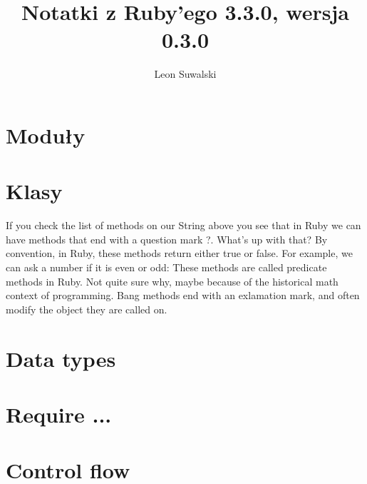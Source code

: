 \documentclass{a5charun}
\title{Notatki z Ruby'ego 3.3.0, wersja 0.3.0}
\author{Leon Suwalski}
\begin{document}
\maketitle

\section{Moduły}


\section{Klasy}






\newpage

If you check the list of methods on our String above you see that in Ruby we can have methods that end with a question mark ?. What’s up with that?
By convention, in Ruby, these methods return either true or false. For example, we can ask a number if it is even or odd:
These methods are called predicate methods in Ruby. Not quite sure why, maybe because of the historical math context of programming.
Bang methods end with an exlamation mark, and often modify the object they are called on. 


\section{Data types}







\section{Require ...}


\section{Control flow}


\end{document}
